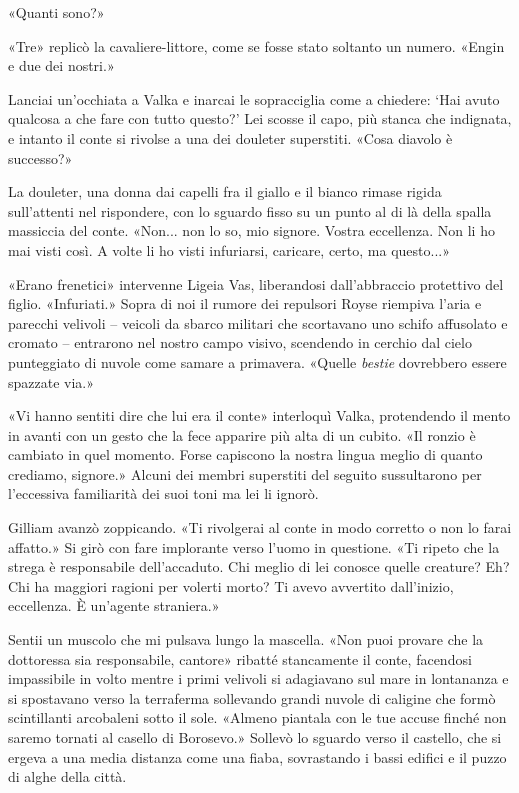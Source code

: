 «Quanti sono?»

«Tre» replicò la cavaliere-littore, come se fosse stato soltanto un
numero. «Engin e due dei nostri.»

Lanciai un'occhiata a Valka e inarcai le sopracciglia come a chiedere:
`Hai avuto qualcosa a che fare con tutto questo?' Lei scosse il capo,
più stanca che indignata, e intanto il conte si rivolse a una dei
douleter superstiti. «Cosa diavolo è successo?»

La douleter, una donna dai capelli fra il giallo e il bianco rimase
rigida sull'attenti nel rispondere, con lo sguardo fisso su un punto al
di là della spalla massiccia del conte. «Non... non lo so, mio signore.
Vostra eccellenza. Non li ho mai visti così. A volte li ho visti
infuriarsi, caricare, certo, ma questo...»

«Erano frenetici» intervenne Ligeia Vas, liberandosi dall'abbraccio
protettivo del figlio. «Infuriati.» Sopra di noi il rumore dei repulsori
Royse riempiva l'aria e parecchi velivoli -- veicoli da sbarco militari
che scortavano uno schifo affusolato e cromato -- entrarono nel nostro
campo visivo, scendendo in cerchio dal cielo punteggiato di nuvole come
samare a primavera. «Quelle \emph{bestie} dovrebbero essere spazzate
via.»

«Vi hanno sentiti dire che lui era il conte» interloquì Valka,
protendendo il mento in avanti con un gesto che la fece apparire più
alta di un cubito. «Il ronzio è cambiato in quel momento. Forse
capiscono la nostra lingua meglio di quanto crediamo, signore.» Alcuni
dei membri superstiti del seguito sussultarono per l'eccessiva
familiarità dei suoi toni ma lei li ignorò.

Gilliam avanzò zoppicando. «Ti rivolgerai al conte in modo corretto o
non lo farai affatto.» Si girò con fare implorante verso l'uomo in
questione. «Ti ripeto che la strega è responsabile dell'accaduto. Chi
meglio di lei conosce quelle creature? Eh? Chi ha maggiori ragioni per
volerti morto? Ti avevo avvertito dall'inizio, eccellenza. È un'agente
straniera.»

Sentii un muscolo che mi pulsava lungo la mascella. «Non puoi provare
che la dottoressa sia responsabile, cantore» ribatté stancamente il
conte, facendosi impassibile in volto mentre i primi velivoli si
adagiavano sul mare in lontananza e si spostavano verso la terraferma
sollevando grandi nuvole di caligine che formò scintillanti arcobaleni
sotto il sole. «Almeno piantala con le tue accuse finché non saremo
tornati al casello di Borosevo.» Sollevò lo sguardo verso il castello,
che si ergeva a una media distanza come una fiaba, sovrastando i bassi
edifici e il puzzo di alghe della città.

